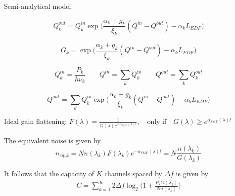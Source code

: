 \documentclass[10pt]{beamer}
\begin{document}
\begin{frame}{Semi-analytical model}

\begin{equation} \nonumber
Q^{out}_k = Q^{in}_k\exp\Big(\frac{\alpha_k + g_k}{\xi_k}(Q^{in} - Q^{out}) - \alpha_kL_{EDF}\Big)
\end{equation}

\begin{equation} \nonumber
G_k = \exp\Big(\frac{\alpha_k + g_k}{\xi_k}(Q^{in} - Q^{out}) - \alpha_kL_{EDF}\Big)
\end{equation}

\begin{equation} \nonumber
Q^{in}_k = \frac{P_k}{h\nu_k}\qquad Q^{in} = \sum_k Q^{in}_k \qquad Q^{out} = \sum_k Q^{out}_k
\end{equation}

\begin{equation} \nonumber
Q^{out} = \sum_kQ^{in}_k\exp\Big(\frac{\alpha_k + g_k}{\xi_k}(Q^{in} - Q^{out}) - \alpha_kL_{EDF}\Big)
\end{equation}

\end{frame}

%
\begin{frame}
\begin{center}
		\resizebox{\textwidth}{!}{}
\end{center}

Ideal gain flattening: $\displaystyle F(\lambda) = \displaystyle\frac{1}{G(\lambda)e^{-\alpha_{\text{SMF}}(\lambda)l}}, \quad \text{only if} \quad G(\lambda) \geq e^{\alpha_{\text{SMF}}(\lambda)l}$

\vspace{0.5cm}
The equivalent noise is given by
\begin{equation*}
	n_{eq, k} = Nn(\lambda_k)F(\lambda_k)e^{-\alpha_{\text{SMF}}(\lambda)l} = N\frac{n(\lambda_k)}{G(\lambda_k)}
\end{equation*}

It follows that the capacity of $K$ channels spaced by $\Delta f$ is given by
~
\begin{align} \nonumber
C =\sum_{k = 1}^{K} 2\Delta f\log_2\Bigg(1 + \frac{P_kG(\lambda_k)}{Nn(\lambda_k)}\Bigg)
\end{align}
\end{frame}
\end{document}
